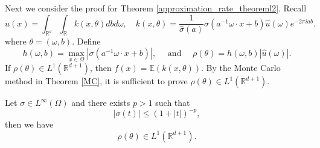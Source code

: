 Next we consider the proof for Theorem \ref{approximation_rate_theoreml2}. Recall
 \begin{equation} 
u(x) =  \int_{\mathbb{R}^d}\int_\mathbb{R} k(x,\theta) dbd\omega,\quad 
  k(x,\theta)= \frac{1}{ \hat{\sigma}(a)}
  \sigma\left(a^{-1}{\omega}\cdot
    x+b\right)\hat{u}(\omega)e^{-2\pi iab}. 
 \end{equation}
where $\theta=(\omega, b)$. 
 Define 
\begin{equation}\label{key}
h(\omega, b) = \max_{x\in \Omega}|\sigma(a^{-1}\omega\cdot x+b)|, \quad \mbox{ and }\quad \rho(\theta) = h(\omega, b)  |\hat u(\omega)|.
\end{equation}
If $ \rho(\theta) \in L^1(\mathbb{R}^{d+1})$, then $f(x)=\mathbb{E}(k(x,\theta))$. By the Monte Carlo method in Theorem \ref{MC}, it is sufficient to prove $ \rho(\theta) \in L^1(\mathbb{R}^{d+1})$. 
\begin{lemma}
Let $\sigma \in L^{\infty}(\Omega)$ and there exists $p> 1$  such that
	\begin{equation}\label{key}
	|\sigma(t)| \le (1+|t|)^{-p},
	\end{equation}
then we have 
$$
\rho(\theta) \in L^1(\mathbb{R}^{d+1}).
$$
\end{lemma}
